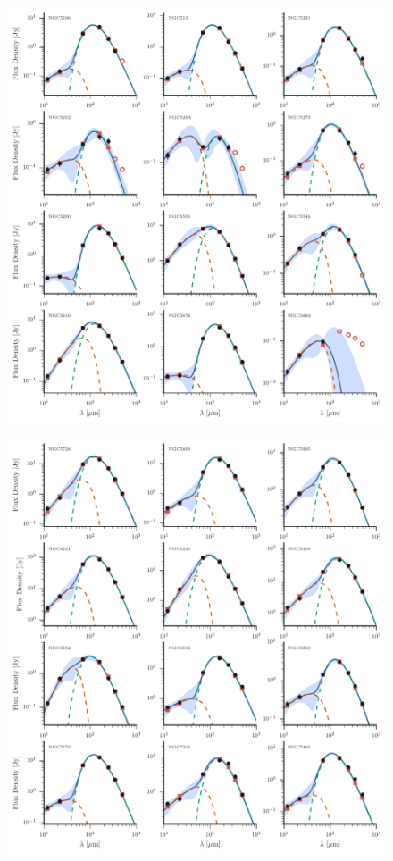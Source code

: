 \begin{figure}
\centering
\includegraphics[width=\textwidth]{figures/sedfig22}
\caption{}
\end{figure}

\begin{figure}
\centering
\includegraphics[width=\textwidth]{figures/sedfig23}
\caption{}
\end{figure}

